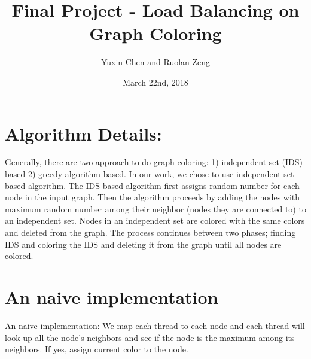 \documentclass[12pt] {article}
\begin{document}
\title{Final Project - Load Balancing on Graph Coloring}
\author{Yuxin Chen and Ruolan Zeng}
\date{March 22nd, 2018}
\maketitle

\section*{Algorithm Details:}
Generally, there are two approach to do graph coloring: 1) independent set (IDS) based 2) greedy algorithm based. In our work, we chose to use independent set based algorithm. %
The IDS-based algorithm first assigns random number for each node in the input graph. Then the algorithm proceeds by adding the nodes with maximum random number among their neighbor (nodes they are connected to) to an independent set. Nodes in an independent set are colored with the same colors and deleted from the graph. The process continues between two phases; finding IDS and coloring the IDS and deleting it from the graph until all nodes are colored. 

\section*{An naive implementation}
An naive implementation: 
We map each thread to each node and each thread will look up all the node's neighbors and see if the node is the maximum among its neighbors. If yes, assign current
color to the node.
\end{document}
